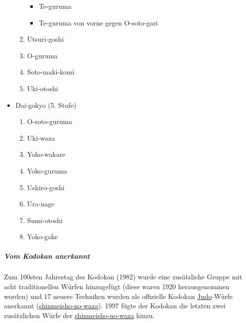 \documentclass[justified, a4paper, notitlepage, captions=tableheading, nobib]{tufte-handout}
\begin{document}
\begin{itemize}
\begin{enumerate}
\begin{itemize}
\item Te-guruma
\item Te-guruma von vorne gegen O-soto-gari
\end{itemize}
\item Utsuri-goshi
\item O-guruma
\item Soto-maki-komi
\item Uki-otoshi
\end{enumerate}
\item Dai-gokyo (5. Stufe)
\begin{enumerate}
\item O-soto-guruma
\item Uki-waza
\item Yoko-wakare
\item Yoko-guruma
\item Ushiro-goshi
\item Ura-nage
\item Sumi-otoshi
\item Yoko-gake
\end{enumerate}
\end{itemize}

\subparagraph{Vom Kodokan anerkannt}
\label{sec:org0c7ffc3}
Zum 100sten Jahrestag des Kodokan (1982) wurde eine zusätzliche Gruppe mit acht traditionellen Würfen hinzugefügt (diese waren 1920 herausgenommen worden) und 17 neuere Techniken wurden als offizielle Kodokan \hyperref[org60aba15]{Judo}-Würfe anerkannt (\hyperref[org7d942f3]{shinmeisho-no-waza}). 1997 fügte der Kodokan die letzten zwei zusätzlichen Würfe der \hyperref[org7d942f3]{shinmeisho-no-waza} hinzu.
\end{document}
